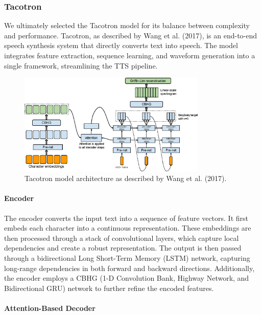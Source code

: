 \subsubsection{Tacotron}

We ultimately selected the Tacotron model for its balance between complexity and performance. Tacotron, as described by Wang et al. (2017), is an end-to-end speech synthesis system that directly converts text into speech. The model integrates feature extraction, sequence learning, and waveform generation into a single framework, streamlining the TTS pipeline.

\begin{figure}[h]
\centering
\includegraphics[width=0.8\textwidth]{tacotron.png}
\caption{Tacotron model architecture as described by Wang et al. (2017).}
\label{fig:tacotron_model}
\end{figure}

\paragraph{Encoder}\mbox{}


The encoder converts the input text into a sequence of feature vectors. It first embeds each character into a continuous representation. These embeddings are then processed through a stack of convolutional layers, which capture local dependencies and create a robust representation. The output is then passed through a bidirectional Long Short-Term Memory (LSTM) network, capturing long-range dependencies in both forward and backward directions. Additionally, the encoder employs a CBHG (1-D Convolution Bank, Highway Network, and Bidirectional GRU) network to further refine the encoded features.

\paragraph{Attention-Based Decoder}\mbox{}


